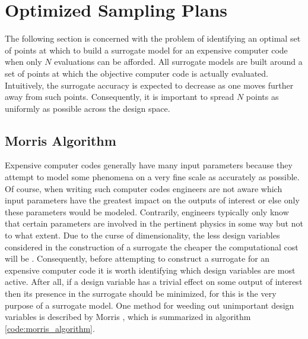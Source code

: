 \section{Optimized Sampling Plans} \label{sec:sampling_plans}

The following section is concerned with the problem of identifying an optimal set of points at which to build a surrogate model for an expensive computer code when only $N$ evaluations can be afforded. All surrogate models are built around a set of points at which the objective computer code is actually evaluated. Intuitively, the surrogate accuracy is expected to decrease as one moves further away from such points. Consequently, it is important to spread $N$ points as uniformly as possible across the design space. 

\subsection{Morris Algorithm}
\label{subsec:morris_algorithm}

Expensive computer codes generally have many input parameters because they attempt to model some phenomena on a very fine scale as accurately as possible. Of course, when writing such computer codes engineers are not aware which input parameters have the greatest impact on the outputs of interest or else only these parameters would be modeled. Contrarily, engineers typically only know that certain parameters are involved in the pertinent physics in some way but not to what extent. Due to the curse of dimensionality, the less design variables considered in the construction of a surrogate the cheaper the computational cost will be \cite{Forrester}. Consequently, before attempting to construct a surrogate for an expensive computer code it is worth identifying which design variables are most active. After all, if a design variable has a trivial effect on some output of interest then its presence in the surrogate should be minimized, for this is the very purpose of a surrogate model. One method for weeding out unimportant design variables is described by Morris \cite{Morris}, which is summarized in algorithm \ref{code:morris_algorithm}.   

